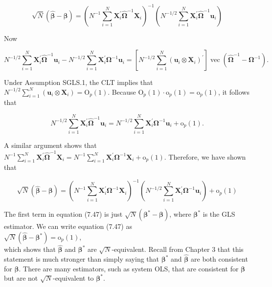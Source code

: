 \documentclass[10pt]{article}
\begin{document}
\begin{equation*}
\sqrt{N}(\hat{\boldsymbol{\beta}}-\boldsymbol{\beta})=\left(N^{-1} \sum_{i=1}^{N} \mathbf{X}_{i}^{\prime} \hat{\boldsymbol{\Omega}}^{-1} \mathbf{X}_{i}\right)^{-1}\left(N^{-1 / 2} \sum_{i=1}^{N} \mathbf{X}_{i}^{\prime} \hat{\boldsymbol{\Omega}}^{-1} \mathbf{u}_{i}\right) \tag{7.46}
\end{equation*}


Now

$$
N^{-1 / 2} \sum_{i=1}^{N} \mathbf{X}_{i}^{\prime} \hat{\boldsymbol{\Omega}}^{-1} \mathbf{u}_{i}-N^{-1 / 2} \sum_{i=1}^{N} \mathbf{X}_{i}^{\prime} \boldsymbol{\Omega}^{-1} \mathbf{u}_{i}=\left[N^{-1 / 2} \sum_{i=1}^{N}\left(\mathbf{u}_{i} \otimes \mathbf{X}_{i}\right)^{\prime}\right] \operatorname{vec}\left(\hat{\boldsymbol{\Omega}}^{-1}-\boldsymbol{\Omega}^{-1}\right) .
$$

Under Assumption SGLS.1, the CLT implies that $N^{-1 / 2} \sum_{i=1}^{N}\left(\mathbf{u}_{i} \otimes \mathbf{X}_{i}\right)=\mathrm{O}_{p}(1)$. Because $\mathrm{O}_{p}(1) \cdot \mathrm{o}_{p}(1)=\mathrm{o}_{p}(1)$, it follows that

$$
N^{-1 / 2} \sum_{i=1}^{N} \mathbf{X}_{i}^{\prime} \hat{\boldsymbol{\Omega}}^{-1} \mathbf{u}_{i}=N^{-1 / 2} \sum_{i=1}^{N} \mathbf{X}_{i}^{\prime} \boldsymbol{\Omega}^{-1} \mathbf{u}_{i}+\mathrm{o}_{p}(1) .
$$

A similar argument shows that $N^{-1} \sum_{i=1}^{N} \mathbf{X}_{i}^{\prime} \hat{\boldsymbol{\Omega}}^{-1} \mathbf{X}_{i}=N^{-1} \sum_{i=1}^{N} \mathbf{X}_{i}^{\prime} \boldsymbol{\Omega}^{-1} \mathbf{X}_{i}+\mathrm{o}_{p}(1)$. Therefore, we have shown that


\begin{equation*}
\sqrt{N}(\hat{\boldsymbol{\beta}}-\boldsymbol{\beta})=\left(N^{-1} \sum_{i=1}^{N} \mathbf{X}_{i}^{\prime} \boldsymbol{\Omega}^{-1} \mathbf{X}_{i}\right)^{-1}\left(N^{-1 / 2} \sum_{i=1}^{N} \mathbf{X}_{i}^{\prime} \boldsymbol{\Omega}^{-1} \mathbf{u}_{i}\right)+\mathrm{o}_{p}(1) \tag{7.47}
\end{equation*}


The first term in equation (7.47) is just $\sqrt{N}\left(\boldsymbol{\beta}^{*}-\boldsymbol{\beta}\right)$, where $\boldsymbol{\beta}^{*}$ is the GLS estimator. We can write equation (7.47) as\\
$\sqrt{N}\left(\hat{\boldsymbol{\beta}}-\boldsymbol{\beta}^{*}\right)=\mathrm{o}_{p}(1)$,\\
which shows that $\hat{\boldsymbol{\beta}}$ and $\boldsymbol{\beta}^{*}$ are $\sqrt{N}$-equivalent. Recall from Chapter 3 that this statement is much stronger than simply saying that $\boldsymbol{\beta}^{*}$ and $\hat{\boldsymbol{\beta}}$ are both consistent for $\boldsymbol{\beta}$. There are many estimators, such as system OLS, that are consistent for $\boldsymbol{\beta}$ but are not $\sqrt{N}$-equivalent to $\boldsymbol{\beta}^{*}$.
\end{document}
